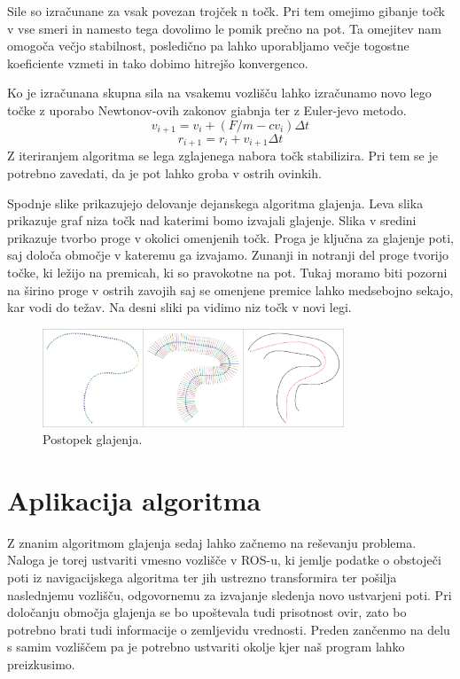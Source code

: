\documentclass[final,5p,times,twocolumn]{elsarticle}
\begin{document}
Sile so izračunane za vsak povezan trojček n točk. Pri tem omejimo gibanje točk v vse smeri in namesto tega dovolimo le pomik prečno na pot. Ta omejitev nam omogoča večjo stabilnost, posledično pa lahko uporabljamo večje togostne koeficiente vzmeti in tako dobimo hitrejšo konvergenco.

Ko je izračunana skupna sila na vsakemu vozlišču lahko izračunamo novo lego točke z uporabo Newtonov-ovih zakonov giabnja ter z Euler-jevo metodo.
\begin{equation}
v_{i + 1} = v_i + (F/m - cv_{i})\Delta t
\end{equation}
\begin{equation}
r_{i + 1} = r_{i} + v_{i + 1} \Delta t 
\end{equation}
Z iteriranjem algoritma se lega zglajenega nabora točk stabilizira. Pri tem se je potrebno zavedati, da je pot lahko groba v ostrih ovinkih.

Spodnje slike prikazujejo delovanje dejanskega algoritma glajenja. Leva slika prikazuje graf niza točk nad katerimi bomo  izvajali glajenje. Slika v sredini prikazuje tvorbo proge v okolici omenjenih točk. Proga je ključna za glajenje poti, saj določa območje v kateremu ga izvajamo. Zunanji in notranji del proge tvorijo točke, ki ležijo na premicah, ki so pravokotne na pot. Tukaj 
moramo biti pozorni na širino proge v ostrih zavojih saj se omenjene premice lahko medsebojno sekajo, kar vodi do težav. Na desni sliki pa vidimo niz točk v novi legi.
\begin{figure}[H]
	\centering
	\includegraphics[width=9cm]{slika6.png}
	\caption{Postopek glajenja.}
	\label{fig:slika}
\end{figure}


\section{Aplikacija algoritma}

Z znanim algoritmom glajenja sedaj lahko začnemo na reševanju problema. Naloga je torej ustvariti vmesno vozlišče v ROS-u, ki jemlje podatke o obstoječi poti iz navigacijskega algoritma ter jih ustrezno transformira ter pošilja naslednjemu vozlišču, odgovornemu za izvajanje sledenja novo ustvarjeni poti. Pri določanju območja glajenja se bo upoštevala tudi prisotnost ovir, zato bo potrebno brati tudi informacije o zemljevidu vrednosti. Preden zančenmo na delu s samim vozliščem pa je potrebno ustvariti okolje kjer naš program lahko preizkusimo.
\end{document}
